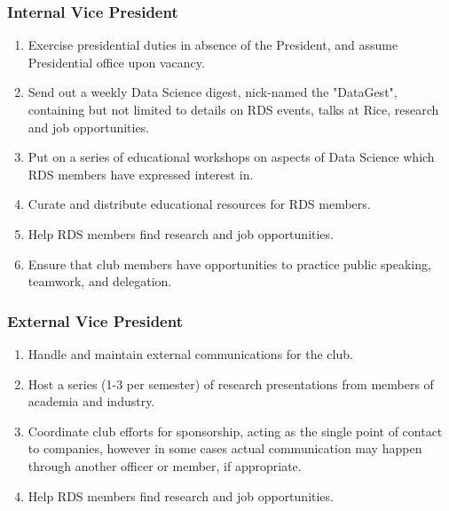 \documentclass[12pt]{article}
\begin{document}

\subsubsection{Internal Vice President}

\begin{enumerate}

  \item Exercise presidential duties in absence of the President, and assume
    Presidential office upon vacancy. 

  \item Send out a weekly Data Science digest, nick-named the "DataGest",
    containing but not limited to details on RDS events, talks at Rice,
    research and job opportunities.

  \item Put on a series of educational workshops on aspects of Data Science
    which RDS members have expressed interest in.

  \item Curate and distribute educational resources for RDS members.

  \item Help RDS members find research and job opportunities.

  \item Ensure that club members have opportunities to practice public
    speaking, teamwork, and delegation. 

\end{enumerate}


\subsubsection{External Vice President}

\begin{enumerate}

  \item Handle and maintain external communications for the club. 

  \item Host a series (1-3 per semester) of research presentations from members
    of academia and industry.

  \item Coordinate club efforts for sponsorship, acting as the single point of
    contact to companies, however in some cases actual communication may happen
    through another officer or member, if appropriate.

  \item Help RDS members find research and job opportunities.

\end{enumerate}
\end{document}
